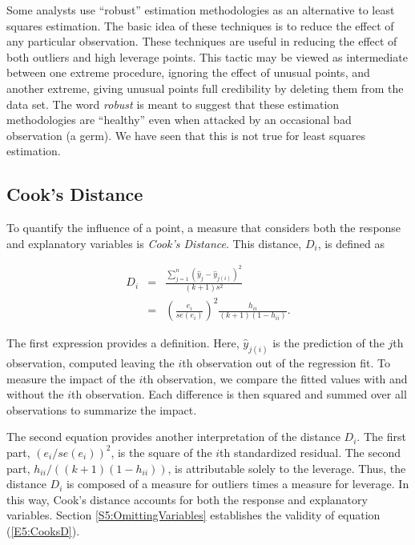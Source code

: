 Some analysts use ``robust'' estimation methodologies as an
alternative to least squares estimation. The basic idea of these
techniques is to reduce the effect of any particular observation.
These techniques are useful in reducing the effect of both outliers
and high leverage points. This tactic may be viewed as intermediate
between one extreme procedure, ignoring the effect of unusual
points, and another extreme, giving unusual points full credibility
by deleting them from the data set. The word \textit{robust }is
meant to suggest that these estimation methodologies are ``healthy''
even when attacked by an occasional bad observation (a germ). We
have seen that this is not true for least squares estimation.

\subsection{Cook's Distance}

To quantify the influence of a point, a measure that considers both
the response and explanatory variables is \textit{Cook's Distance}.
This distance, $D_i$, is defined as

\begin{eqnarray}\label{E5:CooksD}
D_i &=&\frac{\sum_{j=1}^{n}(\hat{y}_j-\hat{y}_{j(i)})^2}{(k+1)s^2} \\
&=&\left(\frac{e_i}{se(e_i)}\right)^2\frac{h_{ii}}{(k+1)(1-h_{ii})}.
\nonumber
\end{eqnarray}

\noindent The first expression provides a definition. Here,
$\hat{y}_{j(i)}$ is the prediction of the $j$th observation,
computed leaving the $i$th observation out of the regression fit. To
measure the impact of the $i$th observation, we compare the fitted
values with and without the $i$th observation. Each difference is
then squared and summed over all observations to summarize the
impact.

The second equation provides another interpretation of the distance
$D_i$. The first part, $(e_i/se(e_i))^2$, is the square of the $i$th
standardized residual. The second part, $h_{ii}/((k+1)(1-h_{ii}))$,
is attributable solely to the leverage. Thus, the distance $D_i$ is
composed of a measure for outliers times a measure for leverage. In
this way, Cook's distance accounts for both the response and
explanatory variables. Section \ref{S5:OmittingVariables}
establishes the validity of equation (\ref{E5:CooksD}).

